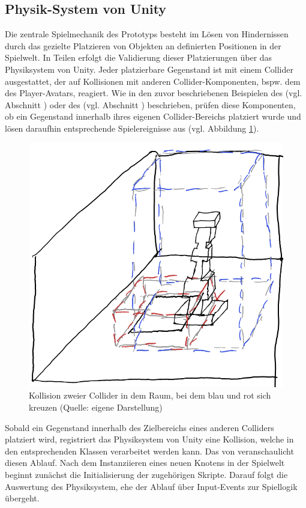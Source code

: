 \subsection{Physik-System von Unity}\label{sec:unity-physics-system}

Die zentrale Spielmechanik des Prototyps besteht im Lösen von Hindernissen durch das gezielte Platzieren von Objekten an definierten Positionen in der Spielwelt. In Teilen erfolgt die Validierung dieser Platzierungen über das Physiksystem von Unity. Jeder platzierbare Gegenstand ist mit einem Collider ausgestattet, der auf Kollisionen mit anderen Collider-Komponenten, bspw. dem des Player-Avatars, reagiert. Wie in den zuvor beschriebenen Beispielen des  (vgl. Abschnitt ) oder des  (vgl. Abschnitt ) beschrieben, prüfen diese Komponenten, ob ein Gegenstand innerhalb ihres eigenen Collider-Bereichs platziert wurde und lösen daraufhin entsprechende Spielereignisse aus (vgl. Abbildung \ref{fig:collision-sketch}). 

\begin{figure}[ht]
\centering
\includegraphics[width=.6\linewidth]{content/pictures/CollisionSketch.png}
\caption{Kollision zweier Collider in dem Raum, bei dem blau und rot sich kreuzen (Quelle: eigene Darstellung)}
\label{fig:collision-sketch}
\end{figure}

Sobald ein Gegenstand innerhalb des Zielbereichs eines anderen Colliders platziert wird, registriert das Physiksystem von Unity eine Kollision, welche in den entsprechenden Klassen verarbeitet werden kann. Das  von  \cite{technologies_unity_nodate} veranschaulicht diesen Ablauf. Nach dem Instanziieren eines neuen Knotens in der Spielwelt beginnt zunächst die Initialisierung der zugehörigen Skripte. Darauf folgt die Auswertung des Physiksystem, ehe der Ablauf über Input-Events zur Spiellogik übergeht.

